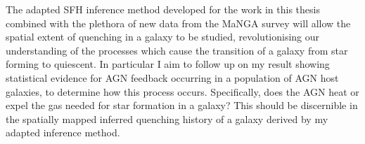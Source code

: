 \documentclass[12pt]{article}
\begin{document}
The adapted SFH inference method developed for the work in this thesis combined with the plethora of new data from the MaNGA survey will allow the spatial extent of quenching in a galaxy to be studied, revolutionising our understanding of the processes which cause the transition of a galaxy from star forming to quiescent. In particular I aim to follow up on my result showing statistical evidence for AGN feedback occurring in a population of AGN host galaxies, to determine how this process occurs. Specifically, does the AGN heat or expel the gas needed for star formation in a galaxy? This should be discernible in the spatially mapped inferred quenching history of a galaxy derived by my adapted inference method.  
\end{document}
